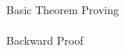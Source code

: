 


\renewcommand{\textfraction}{0.01}	  %
\setcounter{totalnumber}{10}	 	  %
\flushbottom				  %
\pagestyle{slides}			  %
\setlength{\unitlength}{1mm}		  %


\def\_{\char'137}
\def\meta#1{{$\langle\hbox{\it #1\/}\rangle$}}

\def\rul#1{\vrule width0.25mm height#1mm depth-1mm}
\newbox\ubox
\def\und#1#2{%
    \setbox\ubox=\hbox{${\stackrel{\rul{#2}}{\scriptstyle\hbox{\rm #1}}}$}%
    {\wd\ubox=0mm\box\ubox}}






\bsectitle
Basic Theorem Proving\\
{\vrule width20mm height2.5mm depth-2mm}\\
Backward Proof
\esectitle


